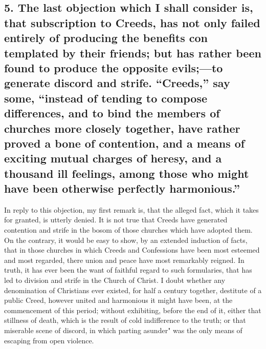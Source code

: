 \documentclass[
]{book}
\begin{document}
\hypertarget{the-last-objection-which-i-shall-consider-is-that-subscription-to-creeds-has-not-only-failed-entirely-of-producing-the-benefits-con-templated-by-their-friends-but-has-rather-been-found-to-produce-the-opposite-evilsto-generate-discord-and-strife.-creeds-say-some-instead-of-tending-to-compose-differences-and-to-bind-the-members-of-churches-more-closely-together-have-rather-proved-a-bone-of-contention-and-a-means-of-exciting-mutual-charges-of-heresy-and-a-thousand-ill-feelings-among-those-who-might-have-been-otherwise-perfectly-harmonious.}{%
\subsection{5. The last objection which I shall consider is, that subscription to Creeds, has not only failed entirely of producing the benefits con templated by their friends; but has rather been found to produce the opposite evils;---to generate discord and strife. ``Creeds,'' say some, ``instead of tending to compose differences, and to bind the members of churches more closely together, have rather proved a bone of contention, and a means of exciting mutual charges of heresy, and a thousand ill feelings, among those who might have been otherwise perfectly harmonious.''}\label{the-last-objection-which-i-shall-consider-is-that-subscription-to-creeds-has-not-only-failed-entirely-of-producing-the-benefits-con-templated-by-their-friends-but-has-rather-been-found-to-produce-the-opposite-evilsto-generate-discord-and-strife.-creeds-say-some-instead-of-tending-to-compose-differences-and-to-bind-the-members-of-churches-more-closely-together-have-rather-proved-a-bone-of-contention-and-a-means-of-exciting-mutual-charges-of-heresy-and-a-thousand-ill-feelings-among-those-who-might-have-been-otherwise-perfectly-harmonious.}}

In reply to this objection, my first remark is, that the alleged fact, which it takes for granted, is utterly denied. It is not true that Creeds have generated contention and strife in the bosom of those churches which have adopted them. On the contrary, it would be easy to show, by an extended induction of facts, that in those churches in which Creeds and Confessions have been most esteemed and most regarded, there union and peace have most remarkably reigned. In truth, it has ever been the want of faithful regard to such formularies, that has led to division and strife in the Church of Christ. I doubt whether any denomination of Christians ever existed, for half a century together, destitute of a public Creed, however united and harmonious it might have been, at the commencement of this period; without exhibiting, before the end of it, either that stillness of death, which is the result of cold indifference to the truth; or that miserable scene of discord, in which parting asunder" was the only means of escaping from open violence.
\end{document}
